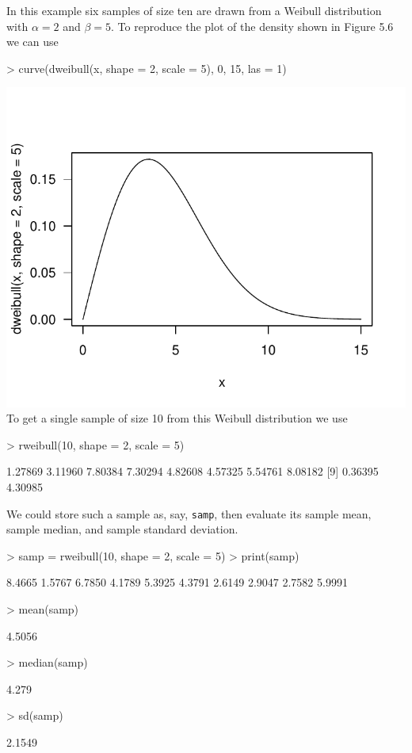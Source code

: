 \documentclass{book}
\begin{document}
In this example six samples of size ten are drawn from a Weibull
distribution with $\alpha=2$ and $\beta=5$.  To reproduce the plot of
the density shown in Figure 5.6 we can use
\begin{Schunk}
\begin{Sinput}
> curve(dweibull(x, shape = 2, scale = 5), 0, 15, las = 1)
\end{Sinput}
\end{Schunk}
\includegraphics{Devore6-xmp0519a}
To get a single sample of size 10 from this Weibull distribution we use
\begin{Schunk}
\begin{Sinput}
> rweibull(10, shape = 2, scale = 5)
\end{Sinput}
\begin{Soutput}
 [1] 1.27869 3.11960 7.80384 7.30294 4.82608 4.57325 5.54761 8.08182
 [9] 0.36395 4.30985
\end{Soutput}
\end{Schunk}
We could store such a sample as, say, \texttt{samp}, then evaluate its
sample mean, sample median, and sample standard deviation.
\begin{Schunk}
\begin{Sinput}
> samp = rweibull(10, shape = 2, scale = 5)
> print(samp)
\end{Sinput}
\begin{Soutput}
 [1] 8.4665 1.5767 6.7850 4.1789 5.3925 4.3791 2.6149 2.9047 2.7582 5.9991
\end{Soutput}
\begin{Sinput}
> mean(samp)
\end{Sinput}
\begin{Soutput}
[1] 4.5056
\end{Soutput}
\begin{Sinput}
> median(samp)
\end{Sinput}
\begin{Soutput}
[1] 4.279
\end{Soutput}
\begin{Sinput}
> sd(samp)
\end{Sinput}
\begin{Soutput}
[1] 2.1549
\end{Soutput}
\end{Schunk}
\end{document}
